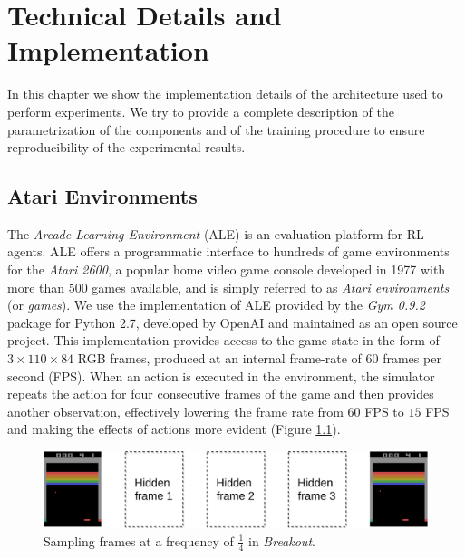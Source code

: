 \chapter{Technical Details and Implementation}
\label{chapter5_technical_details}
\thispagestyle{empty}

\vspace{0.5cm}

In this chapter we show the implementation details of the architecture
used to perform experiments. We try to provide a complete description of the 
parametrization of the components and of the training procedure to ensure 
reproducibility of the experimental results.

\section{Atari Environments}\label{s:atari_envs}
The \textit{Arcade Learning Environment} (ALE) \cite{bellemare2013arcade} is an 
evaluation platform for RL agents.
ALE offers a programmatic interface to hundreds of game environments for the 
\textit{Atari 2600}, a popular home video game console developed in 1977 with 
more than 500 games available, and is simply referred to as 
\textit{Atari environments} (or \textit{games}). 
We use the implementation of ALE provided by the \textit{Gym 0.9.2} package for 
Python 2.7, developed by OpenAI and maintained as an open source project. 
This implementation provides access to the game state in the form of 
$3 \times 110 \times 84$ RGB frames, produced at an internal frame-rate of $60$ 
frames per second (FPS).
When an action is executed in the environment, the simulator repeats the action 
for four consecutive frames of the game and then provides another observation, 
effectively lowering the frame rate from $60$ FPS to $15$ FPS and making the 
effects of actions more evident (Figure \ref{f:sampling}). 
%
\begin{figure}
    \includegraphics[width=\textwidth]{pictures/sampling}
    \centering
    \caption[Sampling frames at a frequency of $\frac{1}{4}$ in \textit{Breakout}]{
	    Sampling frames at a frequency of $\frac{1}{4}$ in \textit{Breakout}.}
    \label{f:sampling}
\end{figure}
